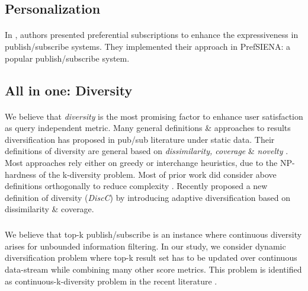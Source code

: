 \documentclass[a4paper,12pt,oneside]{book}
\theoremstyle{definition}
\theoremstyle{remark}
\begin{document}
\subsection{Personalization}
\paragraph*{}
In \cite{Drosou2008}, authors presented preferential subscriptions to enhance the expressiveness in publish/subscribe systems. They implemented their approach in PrefSIENA: a popular publish/subscribe system.  

\subsection{All in one: Diversity}
\paragraph*{}
We believe that \emph{diversity} is the most promising factor to enhance user satisfaction as query independent metric. Many general definitions \& approaches to results diversification has proposed in pub/sub literature under static data. Their definitions of diversity are general based on \emph{dissimilarity, coverage} \& \emph{novelty} \cite{Drosou2010DiversitySurvey}. Most approaches rely either on greedy or interchange heuristics, due to the NP-hardness of the k-diversity problem. Most of prior work did consider above definitions orthogonally to reduce complexity \cite{Drosou2010,Drosou2009}. Recently \cite{Drosou2012} proposed a new definition of diversity (\emph{DiscC}) by introducing adaptive diversification based on dissimilarity \& coverage. 

\subparagraph*{}
We believe that top-k publish/subscribe is an instance where continuous diversity arises for unbounded information filtering. In our study, we consider dynamic diversification problem where top-k result set has to be updated over continuous data-stream while combining many other score metrics. This problem is identified as continuous-k-diversity problem in the recent literature \cite{Drosou2009Diversity, Drosou2012ExtendedDiversity, Drosou2014ExtendedDiversity}. 
\end{document}
